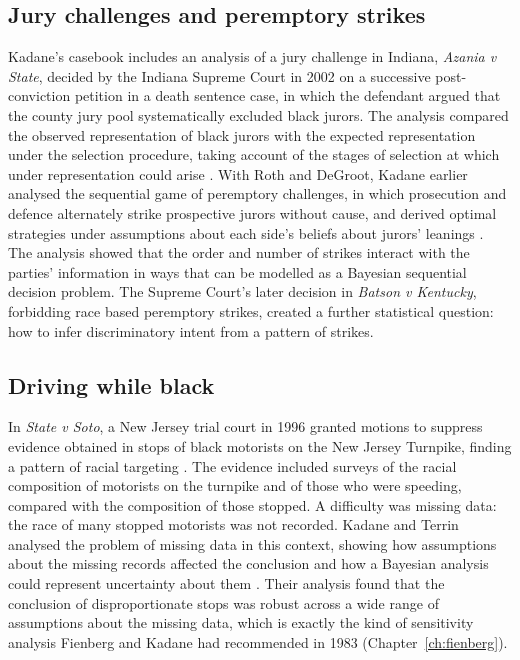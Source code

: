 \subsection{Jury challenges and peremptory strikes}

Kadane's casebook includes an analysis of a jury challenge in Indiana, \emph{Azania v State}, decided by the Indiana Supreme Court in 2002 on a successive post-conviction petition in a death sentence case, in which the defendant argued that the county jury pool systematically excluded black jurors. The analysis compared the observed representation of black jurors with the expected representation under the selection procedure, taking account of the stages of selection at which under representation could arise \citep{kadane2008}. With Roth and DeGroot, Kadane earlier analysed the sequential game of peremptory challenges, in which prosecution and defence alternately strike prospective jurors without cause, and derived optimal strategies under assumptions about each side's beliefs about jurors' leanings \citep{roth1977}. The analysis showed that the order and number of strikes interact with the parties' information in ways that can be modelled as a Bayesian sequential decision problem. The Supreme Court's later decision in \emph{Batson v Kentucky}, forbidding race based peremptory strikes, created a further statistical question: how to infer discriminatory intent from a pattern of strikes.

\subsection{Driving while black}

In \emph{State v Soto}, a New Jersey trial court in 1996 granted motions to suppress evidence obtained in stops of black motorists on the New Jersey Turnpike, finding a pattern of racial targeting \citep{soto1996}. The evidence included surveys of the racial composition of motorists on the turnpike and of those who were speeding, compared with the composition of those stopped. A difficulty was missing data: the race of many stopped motorists was not recorded. Kadane and Terrin analysed the problem of missing data in this context, showing how assumptions about the missing records affected the conclusion and how a Bayesian analysis could represent uncertainty about them \citep{kadane1997}. Their analysis found that the conclusion of disproportionate stops was robust across a wide range of assumptions about the missing data, which is exactly the kind of sensitivity analysis Fienberg and Kadane had recommended in 1983 \citep{fienberg_kadane1983} (Chapter~\ref{ch:fienberg}).

